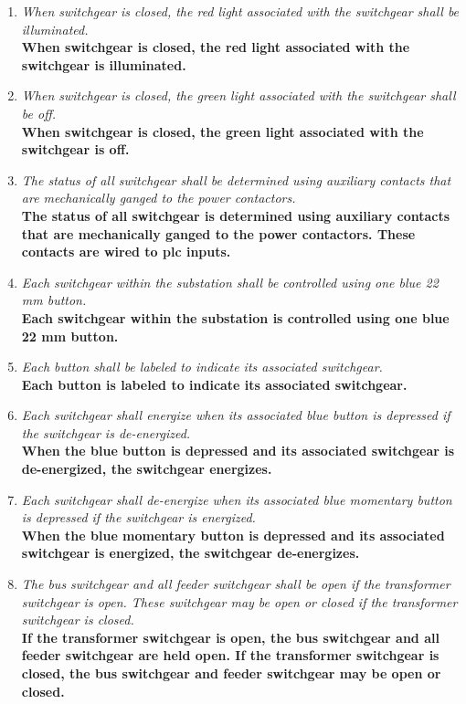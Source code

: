 \begin{enumerate}
  \item \emph{ When switchgear is closed, the red light associated
    with the switchgear shall be illuminated.}\\
    \textbf{When switchgear is closed, the red light associated with
    the switchgear is illuminated.}

  \item \emph{ When switchgear is closed, the green light associated
    with the switchgear shall be off.}\\
    \textbf{When switchgear is closed, the green light associated
    with the switchgear is off.}

  \item \emph{ The status of all switchgear shall be determined using
    auxiliary contacts that are mechanically ganged to the power contactors.}\\
    \textbf{The status of all switchgear is determined using
      auxiliary contacts that are mechanically
      ganged to the power contactors. These contacts are wired to
    \gls{plc} inputs.}

  \item \emph{ Each switchgear within the substation shall be
    controlled using one blue 22 mm button.}\\
    \textbf{Each switchgear within the substation is controlled using
    one blue 22 mm button.}

  \item \emph{ Each button shall be labeled to indicate its
    associated switchgear.}\\
    \textbf{Each button is labeled to indicate its associated switchgear.}

  \item \emph{ Each switchgear shall energize when its associated
    blue button is depressed if the switchgear is de-energized.}\\
    \textbf{When the blue button is depressed and its associated
      switchgear is de-energized,
    the switchgear energizes.}

  \item \emph{ Each switchgear shall de-energize when its associated
    blue momentary button is depressed if the switchgear is energized.}\\
    \textbf{When the blue momentary button is depressed and its
      associated switchgear is energized,
    the switchgear de-energizes.}

  \item \emph{ The bus switchgear and all feeder switchgear shall be
      open if the transformer switchgear is open. These switchgear may
    be open or closed if the transformer switchgear is closed.}\\
    \textbf{If the transformer switchgear is open, the bus switchgear
      and all feeder switchgear are held
      open. If the transformer switchgear is closed, the bus
      switchgear and feeder switchgear
    may be open or closed.}


\end{enumerate}
